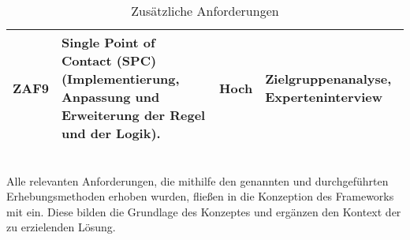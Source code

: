 \begin{table}[hbt!]
\begin{center}
\begin{tabular}{ | p{1.0cm} | p{9.2cm} | p{1.6cm} | p{3.1cm} | }
            \hline
                ZAF9 & Single Point of Contact (SPC) (Implementierung, Anpassung und Erweiterung der Regel und der Logik). & Hoch & Zielgruppenanalyse, Experteninterview \\ 
            \hline
        \end{tabular}
    \end{center}
    \caption{Zusätzliche Anforderungen}
    \label{tab:furtherRequirements}
\end{table} 
\\
Alle relevanten Anforderungen, die mithilfe den genannten und durchgeführten Erhebungsmethoden erhoben wurden, fließen in die Konzeption 
des Frameworks mit ein. Diese bilden die Grundlage des Konzeptes und ergänzen den Kontext der zu erzielenden Lösung.
